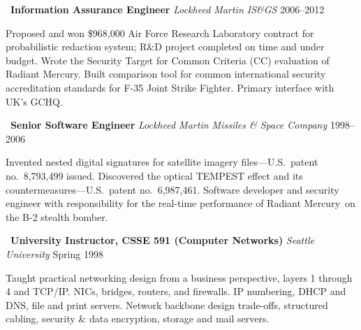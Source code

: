 \vspace{2mm}
\noindent\textbullet\ \textbf{Information Assurance Engineer}
    \hfill \emph{Lockheed Martin IS\&GS} \hfill 2006--2012

    \vspace{1mm}
    \noindent Proposed and won \$968,000 Air Force Research Laboratory
    contract for probabilistic redaction system; R\&D
    project completed on time and under budget. Wrote the
    Security Target for Common Criteria (CC) evaluation of Radiant
    Mercury\rmtrademark. Built comparison tool for common international
    security accreditation standards for F-35 Joint Strike Fighter.
    Primary interface with UK's GCHQ.

\vspace{2mm}
\noindent\textbullet\ \textbf{Senior Software Engineer}
    \hfill \emph{Lockheed Martin Missiles \& Space Company} \hfill 1998--2006

    \vspace{1mm}
    \noindent Invented nested digital signatures for satellite imagery
    files---U.S.\ patent no.~8,793,499 issued. Discovered the
    optical TEMPEST effect and its countermeasures---U.S.\ patent
    no.~6,987,461. Software developer and security engineer with
    responsibility for the real-time performance of Radiant
    Mercury\rmtrademark\ on the B-2 stealth bomber.

\vspace{2mm}
\noindent\textbullet\ \textbf{University Instructor, CSSE 591 (Computer Networks)}
    \hfill \emph{Seattle University} \hfill Spring 1998

    \vspace{1mm}
    \noindent Taught practical networking design from a business perspective, layers
    1 through 4 and TCP/IP. NICs, bridges, routers, and firewalls.
    IP numbering, DHCP and DNS, file and print servers. Network
    backbone design trade-offs, structured cabling, security \& data
    encryption, storage and mail servers.

